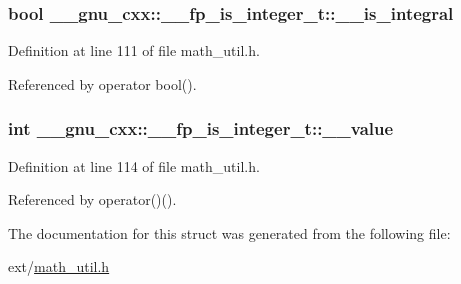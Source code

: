 \subsubsection[{\texorpdfstring{\+\_\+\+\_\+is\+\_\+integral}{__is_integral}}]{\setlength{\rightskip}{0pt plus 5cm}bool \+\_\+\+\_\+gnu\+\_\+cxx\+::\+\_\+\+\_\+fp\+\_\+is\+\_\+integer\+\_\+t\+::\+\_\+\+\_\+is\+\_\+integral}\hypertarget{struct____gnu__cxx_1_1____fp__is__integer__t_a11cf72023d9f2eb1e3982d093de58493}{}\label{struct____gnu__cxx_1_1____fp__is__integer__t_a11cf72023d9f2eb1e3982d093de58493}


Definition at line 111 of file math\+\_\+util.\+h.



Referenced by operator bool().

\subsubsection[{\texorpdfstring{\+\_\+\+\_\+value}{__value}}]{\setlength{\rightskip}{0pt plus 5cm}int \+\_\+\+\_\+gnu\+\_\+cxx\+::\+\_\+\+\_\+fp\+\_\+is\+\_\+integer\+\_\+t\+::\+\_\+\+\_\+value}\hypertarget{struct____gnu__cxx_1_1____fp__is__integer__t_ad30e10c2e2dc2b23d42b4bbbf5592425}{}\label{struct____gnu__cxx_1_1____fp__is__integer__t_ad30e10c2e2dc2b23d42b4bbbf5592425}


Definition at line 114 of file math\+\_\+util.\+h.



Referenced by operator()().



The documentation for this struct was generated from the following file\+:\begin{DoxyCompactItemize}
\item 
ext/\hyperlink{math__util_8h}{math\+\_\+util.\+h}\end{DoxyCompactItemize}
